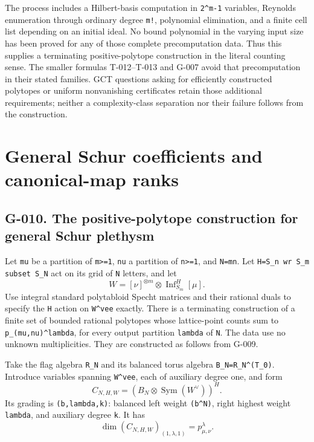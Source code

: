 \documentclass[
  10pt,
]{article}
\begin{document}
The process includes a Hilbert-basis computation in
\texttt{\small 2\textasciicircum{}m-\allowbreak{}1} variables, Reynolds
enumeration through ordinary degree \texttt{\small m!}, polynomial
elimination, and a finite cell list depending on an initial ideal. No
bound polynomial in the varying input size has been proved for any of
those complete precomputation data. Thus this supplies a terminating
positive-polytope construction in the literal counting sense. The
smaller formulas T-012--T-013 and G-007 avoid that precomputation in
their stated families. GCT questions asking for efficiently constructed
polytopes or uniform nonvanishing certificates retain those additional
requirements; neither a complexity-class separation nor their failure
follows from the construction.

\section{General Schur coefficients and canonical-map
ranks}\label{general-schur-coefficients-and-canonical-map-ranks}

\subsection{G-010. The positive-polytope construction for general Schur
plethysm}\label{g-010.-the-positive-polytope-construction-for-general-schur-plethysm}

Let \texttt{\small mu} be a partition of
\texttt{\small m>=\allowbreak{}1}, \texttt{\small nu} a partition of
\texttt{\small n>=\allowbreak{}1}, and
\texttt{\small N=\allowbreak{}mn}. Let
\texttt{\small H=\allowbreak{}S\_\allowbreak{}n wr S\_\allowbreak{}m subset S\_\allowbreak{}N}
act on its grid of \texttt{\small N} letters, and let \[
W=[\nu]^{\otimes m}\otimes\operatorname{Inf}_{S_m}^H[\mu].
\] Use integral standard polytabloid Specht matrices and their rational
duals to specify the \texttt{\small H} action on
\texttt{\small W\textasciicircum{}vee} exactly. There is a terminating
construction of a finite set of bounded rational polytopes whose
lattice-point counts sum to
\texttt{\small p\_\allowbreak{}(\allowbreak{}mu,\allowbreak{}nu)\allowbreak{}\textasciicircum{}lambda},
for every output partition \texttt{\small lambda} of \texttt{\small N}.
The data use no unknown multiplicities. They are constructed as follows
from G-009.

Take the flag algebra \texttt{\small R\_\allowbreak{}N} and its balanced
torus algebra
\texttt{\small B\_\allowbreak{}N=\allowbreak{}R\_\allowbreak{}N\textasciicircum{}(\allowbreak{}T\_\allowbreak{}0)\allowbreak{}}.
Introduce variables spanning \texttt{\small W\textasciicircum{}vee},
each of auxiliary degree one, and form \[
C_{N,H,W}=(B_N\otimes\operatorname{Sym}(W^\vee))^H.
\tag{G10.1}
\] Its grading is
\texttt{\small (\allowbreak{}b,\allowbreak{}lambda,\allowbreak{}k)\allowbreak{}}:
balanced left weight
\texttt{\small (\allowbreak{}b\textasciicircum{}N)\allowbreak{}}, right
highest weight \texttt{\small lambda}, and auxiliary degree
\texttt{\small k}. It has \[
\boxed{\dim(C_{N,H,W})_{(1,\lambda,1)}=p_{\mu,\nu}^{\lambda}.}
\tag{G10.2}
\]
\end{document}
